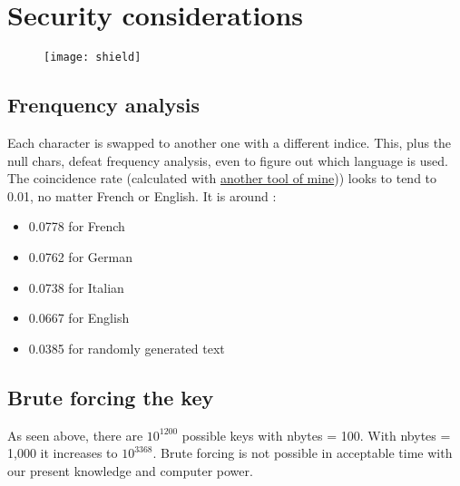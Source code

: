 \section{Security considerations}

\begin{figure}[H]
    \centering
    \texttt{[image: shield]}
\end{figure}

\subsection{Frenquency analysis}

Each character is swapped to another one with a different indice. This, plus the null chars, defeat frequency analysis, even to figure out which language is used.
\newline
The coincidence rate (calculated with \href{https://github.com/Lcram33/frequency_analysis}{another tool of mine})) looks to tend to 0.01, no matter French or English.
\newline
\newline
It is around :
\begin{itemize}
    \item 0.0778 for French
    \item 0.0762 for German
    \item 0.0738 for Italian
    \item 0.0667 for English
    \item 0.0385 for randomly generated text
\end{itemize}

\subsection{Brute forcing the key}

As seen above, there are $10^{1200}$ possible keys with nbytes = 100. With nbytes = 1,000 it increases to $10^{3368}$.
\newline
Brute forcing is not possible in acceptable time with our present knowledge and computer power.